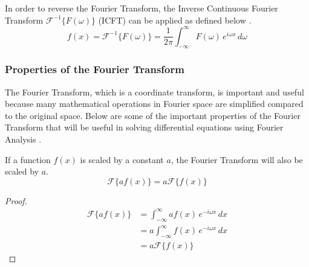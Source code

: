 \begin{definition}
    In order to reverse the Fourier Transform, the Inverse Continuous Fourier Transform $\mathcal{F}^{-1}\{ F(\omega) \}$ (ICFT) can be applied as defined below \citep{grafakos2008classical}.
    \begin{equation} \label{eq:inverse_fourier_transform}
        f(x) = \mathcal{F}^{-1}\{ F(\omega) \} = \frac{1}{2\pi} \int_{-\infty}^{\infty} F(\omega) \, e^{i \omega x} \,d \omega
    \end{equation}
\end{definition}

\subsubsection{Properties of the Fourier Transform}
The Fourier Transform, which is a coordinate transform, is important and useful because many mathematical operations in Fourier space are simplified compared to the original space. Below are some of the important properties of the Fourier Transform that will be useful in solving differential equations using Fourier Analysis \citep{bahouri2011fourier, 3Blue1Brown_fourier_2018}.
\begin{lemma}
    \label{fourier_scaling}
    If a function \(f(x)\) is scaled by a constant $a$, the Fourier Transform will also be scaled by $a$.
    \begin{equation}
        \mathcal{F}\{ a f(x) \} = a \mathcal{F}\{ f(x) \}
    \end{equation}
\end{lemma}

\begin{proof}
    \begin{align*}
        \mathcal{F}\{ a f(x) \} &= \int_{-\infty}^{\infty} a f(x) \, e^{-i \omega x} \,dx \\
        &= a \int_{-\infty}^{\infty} f(x) \, e^{-i \omega x} \,dx \\
        &= a \mathcal{F}\{ f(x) \}
    \end{align*}
\end{proof}


